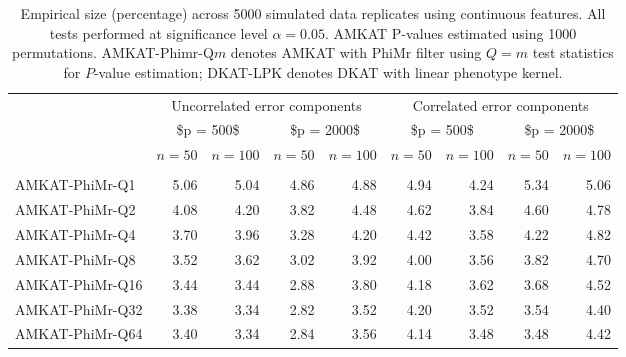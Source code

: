 \documentclass[a4paper,oneside,10pt]{article}\usepackage[]{graphicx}\usepackage[]{color}
\newenvironment{knitrout}{}{} %
\begin{document}
\begin{knitrout}
\color{fgcolor}\begin{table}

\caption{\label{tab:size_cts}Empirical size (percentage) across 5000 simulated data replicates  using continuous features. All tests performed at significance level $\alpha = 0.05$. AMKAT P-values estimated using 1000 permutations. AMKAT-Phimr-Q$m$ denotes AMKAT with PhiMr filter using $Q=m$ test statistics for $P$-value estimation; DKAT-LPK denotes DKAT with linear phenotype kernel.}
\centering
\begin{tabular}[t]{lrrrrrrrr}
\toprule
\multicolumn{1}{c}{ } & \multicolumn{4}{c}{Uncorrelated error components} & \multicolumn{4}{c}{Correlated error components} \\
\cmidrule(l{3pt}r{3pt}){2-5} \cmidrule(l{3pt}r{3pt}){6-9}
\multicolumn{1}{c}{ } & \multicolumn{2}{c}{\$p = 500\$} & \multicolumn{2}{c}{\$p = 2000\$} & \multicolumn{2}{c}{\$p = 500\$} & \multicolumn{2}{c}{\$p = 2000\$} \\
\cmidrule(l{3pt}r{3pt}){2-3} \cmidrule(l{3pt}r{3pt}){4-5} \cmidrule(l{3pt}r{3pt}){6-7} \cmidrule(l{3pt}r{3pt}){8-9}
  & $n = 50$ & $n = 100$ & $n = 50$ & $n = 100$ & $n = 50$ & $n = 100$ & $n = 50$ & $n = 100$\\
\midrule
\addlinespace[0.3em]
\multicolumn{9}{l}{\textbf{Multivariate normal errors}}\\
\hspace{1em}AMKAT-PhiMr-Q1 & 5.06 & 5.04 & 4.86 & 4.88 & 4.94 & 4.24 & 5.34 & 5.06\\
\hspace{1em}AMKAT-PhiMr-Q2 & 4.08 & 4.20 & 3.82 & 4.48 & 4.62 & 3.84 & 4.60 & 4.78\\
\hspace{1em}AMKAT-PhiMr-Q4 & 3.70 & 3.96 & 3.28 & 4.20 & 4.42 & 3.58 & 4.22 & 4.82\\
\hspace{1em}AMKAT-PhiMr-Q8 & 3.52 & 3.62 & 3.02 & 3.92 & 4.00 & 3.56 & 3.82 & 4.70\\
\hspace{1em}AMKAT-PhiMr-Q16 & 3.44 & 3.44 & 2.88 & 3.80 & 4.18 & 3.62 & 3.68 & 4.52\\
\hspace{1em}AMKAT-PhiMr-Q32 & 3.38 & 3.34 & 2.82 & 3.52 & 4.20 & 3.52 & 3.54 & 4.40\\
\hspace{1em}AMKAT-PhiMr-Q64 & 3.40 & 3.34 & 2.84 & 3.56 & 4.14 & 3.48 & 3.48 & 4.42\\

\end{tabular}
\end{table}
\end{knitrout}
\end{document}
